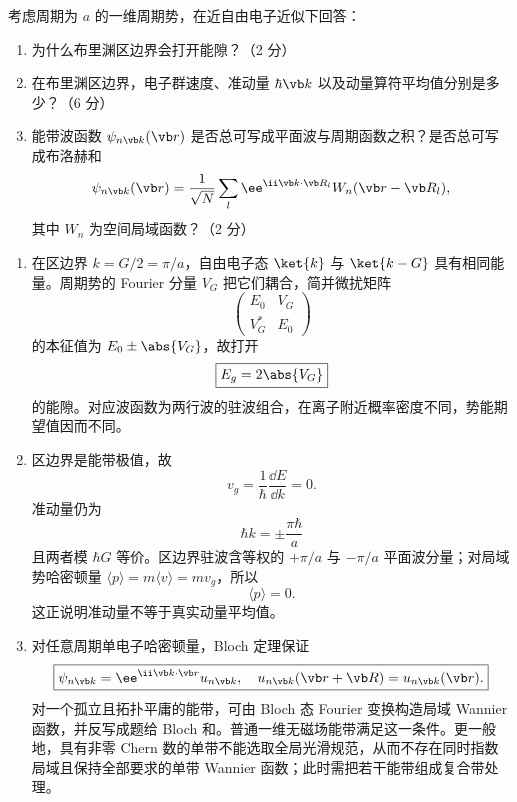\begin{question}[10 分]
考虑周期为 $a$ 的一维周期势，在近自由电子近似下回答：
\begin{enumerate}
  \item 为什么布里渊区边界会打开能隙？（2 分）
  \item 在布里渊区边界，电子群速度、准动量 $\hbar\vb k$ 以及动量算符平均值分别是多少？（6 分）
  \item 能带波函数 $\psi_{n\vb k}(\vb r)$ 是否总可写成平面波与周期函数之积？是否总可写成布洛赫和
  \[
  \psi_{n\vb k}(\vb r)=\frac1{\sqrt N}\sum_l
  \ee^{\ii\vb k\cdot\vb R_l}W_n(\vb r-\vb R_l),
  \]
  其中 $W_n$ 为空间局域函数？（2 分）
\end{enumerate}


\begin{solution}
\begin{enumerate}
  \item 在区边界 $k=G/2=\pi/a$，自由电子态 $\ket{k}$ 与 $\ket{k-G}$ 具有相同能量。周期势的 Fourier 分量 $V_G$ 把它们耦合，简并微扰矩阵
  \[
    \begin{pmatrix}E_0&V_G\\V_G^*&E_0\end{pmatrix}
  \]
  的本征值为 $E_0\pm\abs{V_G}$，故打开
  \[
    \boxed{E_g=2\abs{V_G}}
  \]
  的能隙。对应波函数为两行波的驻波组合，在离子附近概率密度不同，势能期望值因而不同。
  \item 区边界是能带极值，故
  \[
    \boxed{v_g=\frac1\hbar\frac{\dd E}{\dd k}=0.}
  \]
  准动量仍为
  \[
    \boxed{\hbar k=\pm\frac{\pi\hbar}{a}}
  \]
  且两者模 $\hbar G$ 等价。区边界驻波含等权的 $+\pi/a$ 与 $-\pi/a$ 平面波分量；对局域势哈密顿量
  $\langle p\rangle=m\langle v\rangle=m v_g$，所以
  \[
    \boxed{\langle p\rangle=0.}
  \]
  这正说明准动量不等于真实动量平均值。
  \item 对任意周期单电子哈密顿量，Bloch 定理保证
  \[
    \boxed{\psi_{n\vb k}=\ee^{\ii\vb k\cdot\vb r}u_{n\vb k},
    \quad u_{n\vb k}(\vb r+\vb R)=u_{n\vb k}(\vb r).}
  \]
  对一个孤立且拓扑平庸的能带，可由 Bloch 态 Fourier 变换构造局域 Wannier 函数，并反写成题给 Bloch 和。普通一维无磁场能带满足这一条件。更一般地，具有非零 Chern 数的单带不能选取全局光滑规范，从而不存在同时指数局域且保持全部要求的单带 Wannier 函数；此时需把若干能带组成复合带处理。
\end{enumerate}
\end{solution}
\end{question}

